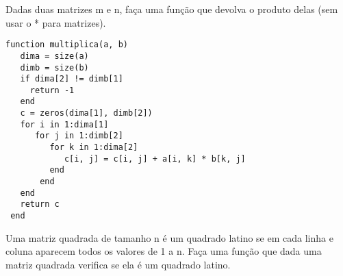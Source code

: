 \documentclass[a4paper]{article}
\begin{document}
 Dadas duas matrizes m e n, faça uma função que devolva o
produto delas (sem usar o * para matrizes).

\lstset{language=ein-julia,label= ,caption= ,captionpos=b,numbers=none}
\begin{lstlisting}
function multiplica(a, b)
   dima = size(a)
   dimb = size(b)
   if dima[2] != dimb[1]
     return -1
   end
   c = zeros(dima[1], dimb[2])
   for i in 1:dima[1]
      for j in 1:dimb[2]
         for k in 1:dima[2]
            c[i, j] = c[i, j] + a[i, k] * b[k, j]
         end
       end
   end
   return c
 end

\end{lstlisting}

Uma matriz quadrada de tamanho n é um quadrado latino se em cada linha e coluna
aparecem todos os valores de 1 a n. Faça uma função que dada uma matriz
quadrada verifica se ela é um quadrado latino.
\end{document}
